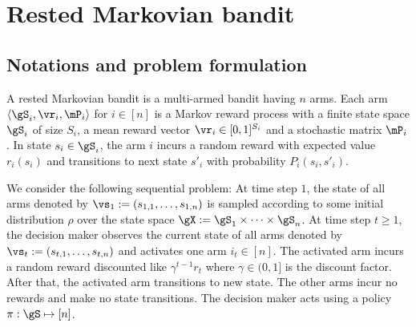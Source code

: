 \section{Rested Markovian bandit}
\label{sec:rested_mab}



\subsection{Notations and problem formulation}
\label{ssec:rested_formul}

A rested Markovian bandit is a multi-armed bandit having $n$ arms.
Each arm $\langle\gS_i, \vr_i, \mP_i\rangle$ for $i\in[n]$ is a Markov reward process with a finite state space $\gS_i$ of size $S_i$, a mean reward vector $\vr_i\in[0,1]^{S_i}$ and a stochastic matrix $\mP_i$.
In state $s_i\in\gS_i$, the arm $i$ incurs a random reward with expected value $r_i(s_i)$ and transitions to next state $s'_i$ with probability $P_i(s_i,s'_i)$.

We consider the following sequential problem: At time step $1$, the state of all arms denoted by $\vs_1:=(s_{1,1},\dots,s_{1,n})$ is sampled according to some initial distribution $\rho$ over the state space $\gX:=\gS_1\times\dots\times\gS_n$.
At time step $t\ge1$, the decision maker observes the current state of all arms denoted by $\vs_t:=(s_{t,1},\dots,s_{t,n})$ and activates one arm $i_t\in[n]$.
The activated arm incurs a random reward discounted like $\gamma^{t-1}r_t$ where $\gamma\in(0,1]$ is the discount factor.
After that, the activated arm transitions to new state. %
The other arms incur no rewards and make no state transitions.
The decision maker acts using a policy $\pi:\gS\mapsto[n]$. 

